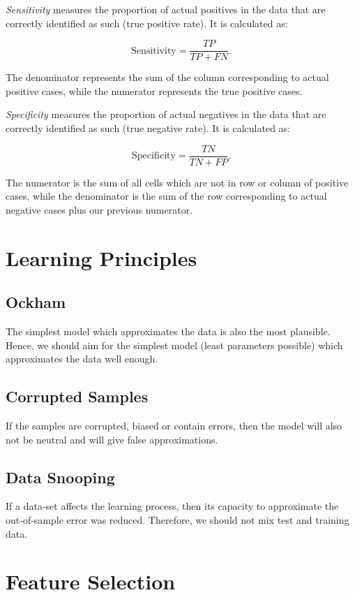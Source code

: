 \emph{Sensitivity} measures the proportion of actual positives in the data that are correctly identified as such (true positive rate). It is calculated as:

\[
	\text{Sensitivity} = \frac{TP}{TP + FN}.
\]

The denominator represents the sum of the column corresponding to actual positive cases, while the numerator represents the true positive cases.

\emph{Specificity} measures the proportion of actual negatives in the data that are correctly identified as such (true negative rate). It is calculated as:

\[
	\text{Specificity} = \frac{TN}{TN + FP}.
\]

The numerator is the sum of all cells which are not in row or column of positive cases, while the denominator is the sum of the row corresponding to actual negative cases plus
our previous numerator.

\section{Learning Principles}

\subsection*{Ockham}

The simplest model which approximates the data is also the most plausible. Hence, we should aim for the simplest model (least parameters possible) which 
approximates the data well enough.

\subsection*{Corrupted Samples}

If the samples are corrupted, biased or contain errors, then the model will also not be neutral
and will give false approximations.

\subsection*{Data Snooping}

If a data-set affects the learning process, then its capacity to approximate the out-of-sample error
was reduced. Therefore, we should not mix test and training data.

\section{Feature Selection}

